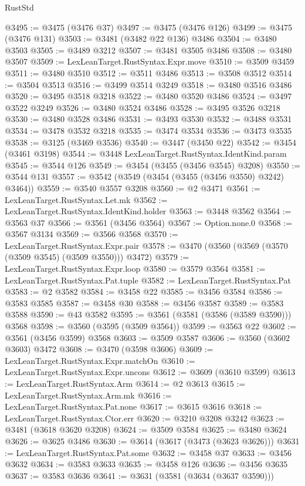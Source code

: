 \begin{lexlean}{RustStd}
\begin{coremodule}
@3495 := @3475 (@3476 @37)
@3497 := @3475 (@3476 @126)
@3499 := @3475 (@3476 @131)
@3503 := @3481 (@3482 @22 @136) @3486
@3504 := @3480 @3503
@3505 := @3489 @3212
@3507 := @3481 @3505 @3486
@3508 := @3480 @3507
@3509 := LexLeanTarget.RustSyntax.Expr.move
@3510 := @3509 @3459
@3511 := @3480 @3510
@3512 := @3511 @3486
@3513 := @3508 @3512
@3514 := @3504 @3513
@3516 := @3499 @3514 @3249
@3518 := @3480 @3516 @3486
@3520 := @3495 @3518 @3218
@3522 := @3480 @3520 @3486
@3524 := @3497 @3522 @3249
@3526 := @3480 @3524 @3486
@3528 := @3495 @3526 @3218
@3530 := @3480 @3528 @3486
@3531 := @3493 @3530
@3532 := @3488 @3531
@3534 := @3478 @3532 @3218
@3535 := @3474 @3534
@3536 := @3473 @3535
@3538 := @3125 (@3469 @3536)
@3540 := @3447 (@3450 @22)
@3542 := @3454 (@3461 @3198)
@3544 := @3448 LexLeanTarget.RustSyntax.IdentKind.param
@3545 := @3544 @126
@3549 := @3454 (@3455 (@3456 @3545) @3208)
@3550 := @3544 @131
@3557 := @3542 (@3549 (@3454 (@3455 (@3456 @3550) @3242) @3464))
@3559 := @3540 @3557 @3208
@3560 := @2 @3471
@3561 := LexLeanTarget.RustSyntax.Let.mk
@3562 := LexLeanTarget.RustSyntax.IdentKind.holder
@3563 := @3448 @3562
@3564 := @3563 @37
@3566 := @3561 (@3456 @3564)
@3567 := Option.none.{0}
@3568 := @3567 @3134
@3569 := @3566 @3568
@3570 := LexLeanTarget.RustSyntax.Expr.pair
@3578 := @3470 (@3560 (@3569 (@3570 (@3509 @3545) (@3509 @3550))) @3472)
@3579 := LexLeanTarget.RustSyntax.Expr.loop
@3580 := @3579 @3564
@3581 := LexLeanTarget.RustSyntax.Pat.tuple
@3582 := LexLeanTarget.RustSyntax.Pat
@3583 := @2 @3582
@3584 := @3458 @22
@3585 := @3456 @3584
@3586 := @3583 @3585
@3587 := @3458 @30
@3588 := @3456 @3587
@3589 := @3583 @3588
@3590 := @43 @3582
@3595 := @3561 (@3581 (@3586 (@3589 @3590))) @3568
@3598 := @3560 (@3595 (@3509 @3564))
@3599 := @3563 @22
@3602 := @3561 (@3456 @3599) @3568
@3603 := @3509 @3587
@3606 := @3560 (@3602 @3603) @3472
@3608 := @3470 (@3598 @3606)
@3609 := LexLeanTarget.RustSyntax.Expr.matchOn
@3610 := LexLeanTarget.RustSyntax.Expr.uncons
@3612 := @3609 (@3610 @3599)
@3613 := LexLeanTarget.RustSyntax.Arm
@3614 := @2 @3613
@3615 := LexLeanTarget.RustSyntax.Arm.mk
@3616 := LexLeanTarget.RustSyntax.Pat.none
@3617 := @3615 @3616
@3618 := LexLeanTarget.RustSyntax.Ctor.err
@3620 := @3210 @3208 @3242
@3623 := @3481 (@3618 @3620 @3208)
@3624 := @3509 @3584
@3625 := @3480 @3624
@3626 := @3625 @3486
@3630 := @3614 (@3617 (@3473 (@3623 @3626)))
@3631 := LexLeanTarget.RustSyntax.Pat.some
@3632 := @3458 @37
@3633 := @3456 @3632
@3634 := @3583 @3633
@3635 := @3458 @126
@3636 := @3456 @3635
@3637 := @3583 @3636
@3641 := @3631 (@3581 (@3634 (@3637 @3590)))

\end{coremodule}
\end{lexlean}
